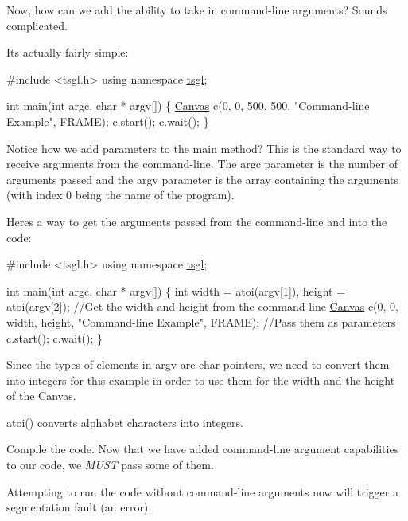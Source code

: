 Now, how can we add the ability to take in command-\/line arguments? Sounds complicated.

Its actually fairly simple\+:


\begin{DoxyCode}
\textcolor{preprocessor}{#include <tsgl.h>}
\textcolor{keyword}{using namespace }\hyperlink{namespacetsgl}{tsgl};

\textcolor{keywordtype}{int} main(\textcolor{keywordtype}{int} argc, \textcolor{keywordtype}{char} * argv[]) \{
  \hyperlink{classtsgl_1_1_canvas}{Canvas} c(0, 0, 500, 500, \textcolor{stringliteral}{"Command-line Example"}, FRAME);
  c.start();
  c.wait();
\}
\end{DoxyCode}


Notice how we add parameters to the main method? This is the standard way to receive arguments from the command-\/line. The argc parameter is the number of arguments passed and the argv parameter is the array containing the arguments (with index 0 being the name of the program).

Here\textquotesingle{}s a way to get the arguments passed from the command-\/line and into the code\+:


\begin{DoxyCode}
\textcolor{preprocessor}{#include <tsgl.h>}
\textcolor{keyword}{using namespace }\hyperlink{namespacetsgl}{tsgl};

\textcolor{keywordtype}{int} main(\textcolor{keywordtype}{int} argc, \textcolor{keywordtype}{char} * argv[]) \{
  \textcolor{keywordtype}{int} width = atoi(argv[1]), height = atoi(argv[2]);  \textcolor{comment}{//Get the width and height from the command-line}
  \hyperlink{classtsgl_1_1_canvas}{Canvas} c(0, 0, width, height, \textcolor{stringliteral}{"Command-line Example"}, FRAME);  \textcolor{comment}{//Pass them as parameters}
  c.start();
  c.wait();
\}
\end{DoxyCode}


Since the types of elements in argv are char pointers, we need to convert them into integers for this example in order to use them for the width and the height of the Canvas.

{\ttfamily atoi()} converts alphabet characters into integers.

Compile the code. Now that we have added command-\/line argument capabilities to our code, we {\itshape M\+U\+S\+T} pass some of them.

Attempting to run the code without command-\/line arguments now will trigger a segmentation fault (an error).

